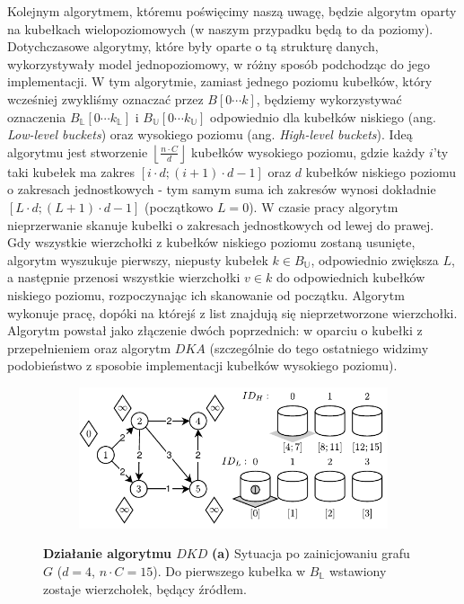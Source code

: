 Kolejnym algorytmem, któremu poświęcimy naszą uwagę, będzie algorytm oparty na kubełkach wielopoziomowych (w naszym przypadku będą to da poziomy). Dotychczasowe algorytmy, które były oparte o tą strukturę danych, wykorzystywały model jednopoziomowy, w różny sposób podchodząc do jego implementacji. W tym algorytmie, zamiast jednego poziomu kubełków, który wcześniej zwykliśmy oznaczać przez $B \left[ 0 \cdots k \right]$, będziemy wykorzystywać oznaczenia $B_{\mathbb{L}} \left[ 0 \cdots k_{\mathbb{L}} \right]$ i $B_{\mathbb{U}} \left[ 0 \cdots k_{\mathbb{U}} \right]$ odpowiednio dla kubełków niskiego (ang. \textit{Low-level buckets}) oraz wysokiego poziomu (ang. \textit{High-level buckets}). Ideą algorytmu jest stworzenie $ \left \lfloor \frac{n \cdot C}{d} \right \rfloor $ kubełków wysokiego poziomu, gdzie każdy $i$'ty taki kubełek ma zakres $ \left[ i \cdot d ; \left( i+1 \right) \cdot d - 1\right]$ oraz $d$ kubełków niskiego poziomu o zakresach jednostkowych - tym samym suma ich zakresów wynosi dokładnie $ \left[ L \cdot d ; \left( L+1 \right) \cdot d - 1\right]$ (początkowo $L=0$). W czasie pracy algorytm nieprzerwanie skanuje kubełki o zakresach jednostkowych od lewej do prawej. Gdy wszystkie wierzchołki z kubełków niskiego poziomu zostaną usunięte, algorytm wyszukuje pierwszy, niepusty kubełek $k \in B_{\mathbb{U}}$, odpowiednio zwiększa $L$, a następnie przenosi wszystkie wierzchołki $v \in k$ do odpowiednich kubełków niskiego poziomu, rozpoczynając ich skanowanie od początku. Algorytm wykonuje pracę, dopóki na którejś z list znajdują się nieprzetworzone wierzchołki. Algorytm powstał jako złączenie dwóch poprzednich: w oparciu o kubełki z przepełnieniem oraz algorytm $DKA$ (szczególnie do tego ostatniego widzimy podobieństwo z sposobie implementacji kubełków wysokiego poziomu).

\begin{figure}[!htbp]
	\centering
	\begin{subfigure}[b]{0.45\textwidth}
		\includegraphics[width=\textwidth]{Chapter_II/DOUBLE-LEVEL-BUCKET-Example/a.pdf}
		\caption{}
	\end{subfigure}%
	\caption{\textbf{Działanie algorytmu $DKD$} \textbf{(a)} Sytuacja po zainicjowaniu grafu $G$ ($d=4$, $n \cdot C = 15$). Do pierwszego kubełka w $B_{\mathbb{L}}$ wstawiony zostaje wierzchołek, będący źródłem. } \label{fig:exampleDoubleLevelBuckets1}
\end{figure}
	
